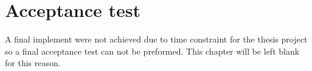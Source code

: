 \chapter{Acceptance test}\label{ch:acctest}
A final implement were not achieved due to time constraint for the thesis project so a final acceptance test can not be preformed. This chapter will be left blank for this reason.